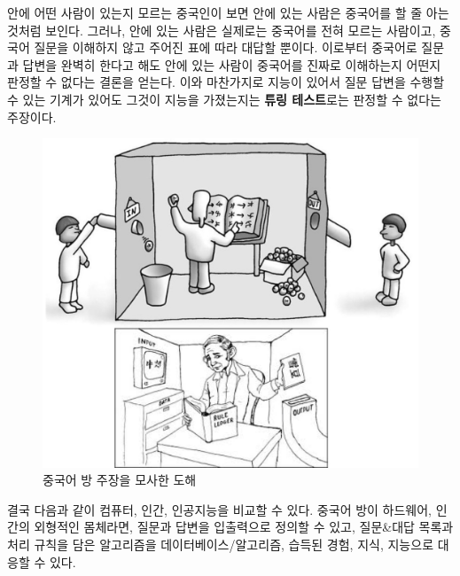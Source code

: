 \documentclass[smallextended]{svjour3}       %
\begin{document}
안에 어떤 사람이 있는지 모르는 중국인이 보면 안에 있는 사람은 중국어를
할 줄 아는 것처럼 보인다. 그러나, 안에 있는 사람은 실제로는 중국어를
전혀 모르는 사람이고, 중국어 질문을 이해하지 않고 주어진 표에 따라
대답할 뿐이다. 이로부터 중국어로 질문과 답변을 완벽히 한다고 해도 안에
있는 사람이 중국어를 진짜로 이해하는지 어떤지 판정할 수 없다는 결론을
얻는다. 이와 마찬가지로 지능이 있어서 질문 답변을 수행할 수 있는 기계가
있어도 그것이 지능을 가졌는지는 \textbf{튜링 테스트}로는 판정할 수
없다는 주장이다.

\begin{figure}

{\centering \includegraphics[width=1\linewidth]{fig/chinese-room-argument} 

}

\caption{중국어 방 주장을 모사한 도해}\label{fig:unnamed-chunk-5}
\end{figure}

결국 다음과 같이 컴퓨터, 인간, 인공지능을 비교할 수 있다. 중국어 방이
하드웨어, 인간의 외형적인 몸체라면, 질문과 답변을 입출력으로 정의할 수
있고, 질문\&대답 목록과 처리 규칙을 담은 알고리즘을
데이터베이스/알고리즘, 습득된 경험, 지식, 지능으로 대응할 수 있다.

\begin{table}[H]
\centering
{}
\end{table}
\end{document}
